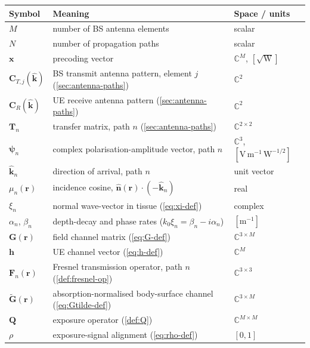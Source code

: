 \documentclass[11pt,a4paper]{article}
\theoremstyle{definition}      %
\newcommand{\khat}{\hat{\bm{k}}}
\begin{document}
\begin{center}
\begin{tabular}{lp{6.5cm}l}
\toprule
Symbol & Meaning & Space / units \\
\midrule
$M$ & number of BS antenna elements & scalar \\
$N$ & number of propagation paths & scalar \\
$\mathbf{x}$ & precoding vector & $\mathbb{C}^M$, $[\sqrt{\mathrm{W}}]$ \\
$\mathbf{C}_{T,j}(\khat)$ & BS transmit antenna pattern, element $j$
  (\cref{sec:antenna-paths}) & $\mathbb{C}^2$ \\
$\mathbf{C}_R(\khat)$ & UE receive antenna pattern
  (\cref{sec:antenna-paths}) & $\mathbb{C}^2$ \\
$\mathbf{T}_n$ & transfer matrix, path $n$
  (\cref{sec:antenna-paths}) & $\mathbb{C}^{2\times 2}$ \\
$\boldsymbol{\psi}_n$ & complex polarisation-amplitude vector, path $n$ &
  $\mathbb{C}^3$, $[\mathrm{V\,m^{-1}\,W^{-1/2}}]$ \\
$\hat{\mathbf{k}}_n$ & direction of arrival, path $n$ & unit vector \\
$\mu_n(\mathbf{r})$ & incidence cosine,
  $\hat{\mathbf{n}}(\mathbf{r})\cdot(-\hat{\mathbf{k}}_n)$ & real \\
$\xi_n$ & normal wave-vector in tissue (\cref{eq:xi-def}) & complex \\
$\alpha_n$, $\beta_n$ & depth-decay and phase rates
  ($k_0\xi_n = \beta_n - i\alpha_n$) & $[\mathrm{m}^{-1}]$ \\
$\mathbf{G}(\mathbf{r})$ & field channel matrix
  (\cref{eq:G-def}) & $\mathbb{C}^{3\times M}$ \\
$\mathbf{h}$ & UE channel vector (\cref{eq:h-def}) & $\mathbb{C}^M$ \\
$\mathbf{F}_n(\mathbf{r})$ & Fresnel transmission operator, path $n$
  (\cref{def:fresnel-op}) & $\mathbb{C}^{3\times 3}$ \\
$\tilde{\mathbf{G}}(\mathbf{r})$ & absorption-normalised body-surface
  channel (\cref{eq:Gtilde-def}) & $\mathbb{C}^{3\times M}$ \\
$\mathbf{Q}$ & exposure operator (\cref{def:Q}) & $\mathbb{C}^{M\times M}$ \\
$\rho$ & exposure-signal alignment (\cref{eq:rho-def}) & $[0,1]$ \\
\bottomrule
\end{tabular}
\end{center}
\end{document}
